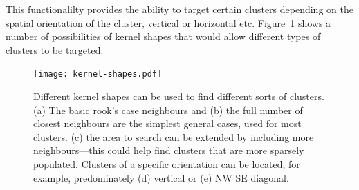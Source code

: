 This functionalilty provides the ability to target certain clusters depending
on the spatial orientation of the cluster, vertical or horizontal etc.
Figure~\ref{fig:kernel-shapes} shows a number of possibilities of kernel shapes
that would allow different types of clusters to be targeted.

\begin{figure}[htbp]
	\centering
	\texttt{[image: kernel-shapes.pdf]}

	\caption[Different kernel shapes for different clusters.]{Different kernel
		shapes can be used to find different sorts of clusters. (a) The basic
		rook's case neighbours and (b) the full number of closest neighbours
		are the simplest general cases, used for most clusters. (c) the area to
		search can be extended by including more neighbours---this could help
		find clusters that are more sparsely populated. Clusters of a specific
		orientation can be located, for example, predominately (d) vertical or
		(e) NW SE diagonal.}\label{fig:kernel-shapes}
\end{figure}

